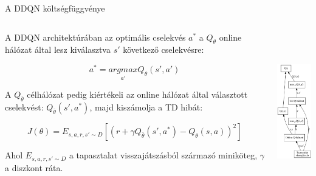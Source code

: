 \documentclass[english, aspectratio=169]{beamer}
\begin{document}
\begin{frame}{A DDQN költségfüggvénye}
\begin{columns}
\begin{column}{.7\textwidth}
A DDQN architektúrában az optimális cselekvés $a^*$ a $Q_\theta$ online hálózat által lesz kiválasztva $s'$ következő cselekvésre:
\begin{block}{}
\[
a^*=\underset{a'}{argmax}Q_\theta(s',a')
\]
\end{block}
A $Q_{\bar{\theta}}$ célhálózat pedig kiértékeli az online hálózat által választott cselekvést: $Q_{\bar{\theta}}(s',a^*)$, majd kiszámolja a TD hibát: 
\begin{block}{}
\[
J(\theta) = E_{s,a,r,s' \sim D} \left[ \left( r + \gamma Q_{\bar{\theta}}(s',a^*) - Q_\theta(s,a) \right)^2 \right]
\]
\end{block}
Ahol $E_{s,a,r,s' \sim D}$ a tapasztalat visszajátszásból származó miniköteg, $\gamma$ a diszkont ráta. 
\end{column}
\begin{column}{.3\textwidth}
\begin{center}
\includegraphics[height=7cm, keepaspectratio]{graphs/dql_3.png}
\end{center}
\end{column}
\end{columns}
\end{frame}
\end{document}
